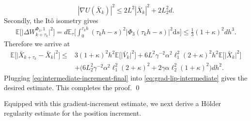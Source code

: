 \documentclass[12pt]{article}
\numberwithin{equation}{section}
\renewenvironment{proof}%
  {\begin{trivlist}%
   \item[]\ignorespaces}%
  {\qed\end{trivlist}}
\begin{document}
\begin{proof}
\begin{equation}
|\nabla U(\bar{X}_k)|^2
\leq
2L^2
|\bar{X}_k|^2
+
2L_2^2d.
\end{equation}
Secondly, the It\^o isometry gives 
\begin{equation}
\label{eq:stochastic-term-bound}
\begin{aligned}
\mathbb{E}
\Big[\big|
\Delta W_{k+\tau_k}^{\Phi_3,1}
\big|^2\Big]  
=    
d
\mathbb{E}_\tau
\bigg[
\int_0^{\tau_kh}
(\tau_kh-s)^2|\Phi_3(\tau_kh-s)|^2
\mathrm{d}s
\bigg]
\leq   
\tfrac{1}{3}
(1+\kappa)^2 d
h^3.
\end{aligned}
\end{equation}
Therefore we arrive at
\begin{equation}
\label{eq:intermediate-increment-final}
\begin{aligned}
\mathbb{E}
\Big[\big|
\bar{X}_{k+\tau_k}
-
\bar{X}_k
\big|^2\Big] 
\leq     &
3 
(1 +  \kappa)^2
h^2
\mathbb{E}
\Big[\big|
\bar{V}_k
\big|^2\Big] 
+
6L^2
\gamma^{-2}
\alpha^2
\ell_1^2
(2 +  \kappa)^2
h^2
\mathbb{E}
\Big[\big|
\bar{X}_k
\big|^2\Big] 
\\    &
+
\big(
6L_2^2
\gamma^{-2}
\alpha^2
\ell_1^2
(2 +  \kappa)^2
+
2\gamma\alpha\ell_2^2(1+\kappa)^2
\big)dh^2.
\end{aligned}
\end{equation}
%
Plugging \eqref{eq:intermediate-increment-final} into \eqref{eq:grad-lip-intermediate} gives the desired estimate.  
This completes the proof.
\end{proof}


Equipped with this gradient-increment estimate, we next derive a H\"older regularity estimate for the position increment.
\end{document}
